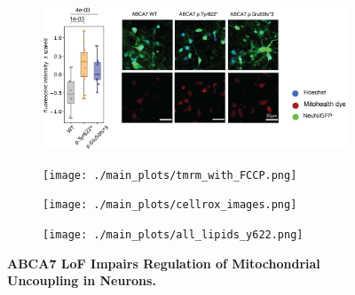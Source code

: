 \begin{figure}[H]
\begin{subfigure}[t]{.2\textwidth}
    \end{subfigure}   
    \begin{subfigure}[t]{.5\textwidth}
        \caption{}
        \includegraphics[width=\textwidth]{./extended_plots/mitohealth_dye.png}        
    \end{subfigure}    
    \begin{subfigure}[t]{.4\textwidth}
        \caption{}
        \texttt{[image: ./main\_plots/tmrm\_with\_FCCP.png]}        
    \end{subfigure}    
    \begin{subfigure}[t]{.3\textwidth}
        \caption{}
        \texttt{[image: ./main\_plots/cellrox\_images.png]}        
    \end{subfigure}  
    \begin{subfigure}[t]{.3\textwidth}
        \caption{}
        \texttt{[image: ./main\_plots/all\_lipids\_y622.png]}        
    \end{subfigure}  
    \caption{
        \textbf{ABCA7 LoF Impairs Regulation of Mitochondrial Uncoupling in Neurons.}\\
    }
    \label{fig:main_mitochondrial}
\end{figure}
